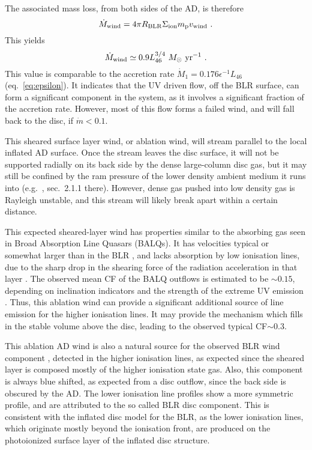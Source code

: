 \documentclass[a4paper,fleqn,usenatbib]{mnras}
\newcommand{\Msun}{M_{\odot}}
\newcommand{\mdot}{\dot{M}}
\begin{document}
The associated mass loss, from both sides of the AD, is therefore
\begin{equation} 
\mdot_{\rm wind}=4\pi R_{\rm BLR} \Sigma_{\rm ion} m_{\rm p} v_{\rm wind}\ .
\end{equation} 
This yields 
\begin{equation} 
\mdot_{\rm wind}\simeq 0.9 L_{46}^{3/4}~ \Msun~{\rm yr}^{-1}\ .
\end{equation} 
This value is comparable to the accretion rate $\mdot_1=0.176\epsilon^{-1}L_{46}$ (eq.~\ref{eq:epsilon}).
It indicates that the UV driven flow, off the BLR surface, can form a significant component in the system, as it involves 
a significant fraction of the accretion rate. However, most of this flow forms a failed wind, and will 
fall back to the disc, if $\dot{m}<0.1$.

This sheared surface layer wind, or ablation wind, will stream parallel to the local inflated AD 
surface. Once the stream leaves the disc surface, it will not be supported radially on its back side 
by the dense large-column disc gas, but it may still be confined by the ram pressure
of the lower density ambient medium it runs into (e.g.\ \citealt{paperIV}, sec.~2.1.1 there). However, dense gas pushed into low density gas is Rayleigh
unstable, and this stream will likely break apart within a certain distance.

This expected sheared-layer wind has properties similar to the absorbing gas seen in Broad Absorption Line Quasars (BALQs). It has
velocities typical or somewhat larger than in the BLR \citep*{Baskin15}, and lacks absorption by low ionisation lines, 
due to the sharp drop in the shearing force of the radiation acceleration in that layer \citep{paperIV}.
The observed mean CF of the BALQ outflows is estimated to be $\sim 0.15$, depending on inclination indicators and the
strength of the extreme UV emission \citep*{Baskin13}. Thus, this ablation wind can provide a significant 
additional source of line emission for the higher ionisation lines. It may provide the mechanism which fills
in the stable volume above the disc, leading to the observed typical CF$\sim 0.3$.

This ablation AD wind is also a natural source for the observed BLR wind component \citep{Richards02}, 
detected in the higher ionisation lines, as expected since the sheared layer is composed mostly of the higher 
ionisation state
gas. Also, this component is always blue shifted, as expected from a disc outflow, since the back side is 
obscured by the AD. The lower ionisation line profiles show a more symmetric profile, and are attributed
to the so called BLR disc component. This is consistent with the inflated disc model for the BLR, 
as the lower ionisation lines,
which originate mostly beyond the ionisation front, are produced on the photoionized surface layer 
of the inflated disc structure.
\end{document}
